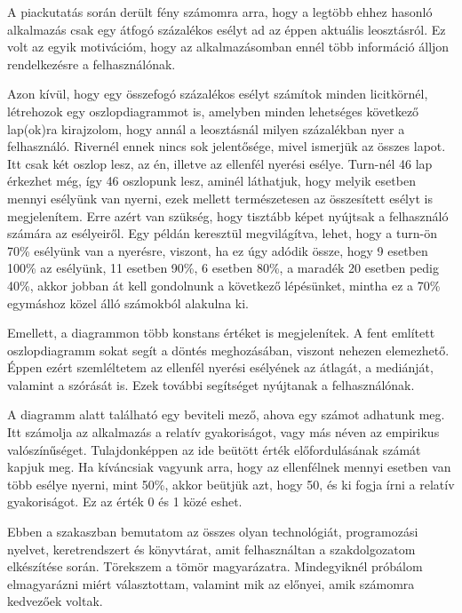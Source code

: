 
A piackutatás során derült fény számomra arra, hogy a legtöbb ehhez hasonló alkalmazás csak egy átfogó százalékos esélyt ad az éppen aktuális leosztásról. Ez volt az egyik motivációm, hogy az alkalmazásomban ennél több információ álljon rendelkezésre a felhasználónak.

Azon kívül, hogy egy összefogó százalékos esélyt számítok minden licitkörnél, létrehozok egy oszlopdiagrammot is, amelyben minden lehetséges következő lap(ok)ra kirajzolom, hogy annál a leosztásnál milyen százalékban nyer a felhasználó. Rivernél ennek nincs sok jelentősége, mivel ismerjük az összes lapot. Itt csak két oszlop lesz, az én, illetve az ellenfél nyerési esélye. Turn-nél 46 lap érkezhet még, így 46 oszlopunk lesz, aminél láthatjuk, hogy melyik esetben mennyi esélyünk van nyerni, ezek mellett természetesen az összesített esélyt is megjelenítem. Erre azért van szükség, hogy tisztább képet nyújtsak a felhasználó számára az esélyeiről. Egy példán keresztül megvilágítva, lehet, hogy a turn-ön 70\% esélyünk van a nyerésre, viszont, ha ez úgy adódik össze, hogy 9 esetben 100\% az esélyünk, 11 esetben 90\%, 6 esetben 80\%, a maradék 20 esetben pedig 40\%, akkor jobban át kell gondolnunk a következő lépésünket, mintha ez a 70\% egymáshoz közel álló számokból alakulna ki.

Emellett, a diagrammon több konstans értéket is megjelenítek. A fent említett oszlopdiagramm sokat segít a döntés meghozásában, viszont nehezen elemezhető. Éppen ezért szemléltetem az ellenfél nyerési esélyének az átlagát, a mediánját, valamint a szórását is. Ezek további segítséget nyújtanak a felhasználónak.

A diagramm alatt található egy beviteli mező, ahova egy számot adhatunk meg. Itt számolja az alkalmazás a relatív gyakoriságot, vagy más néven az empirikus valószínűséget. Tulajdonképpen az ide beütött érték előfordulásának számát kapjuk meg. Ha kíváncsiak vagyunk arra, hogy az ellenfélnek mennyi esetben van több esélye nyerni, mint 50\%, akkor beütjük azt, hogy 50, és ki fogja írni a relatív gyakoriságot. Ez az érték 0 és 1 közé eshet.


Ebben a szakaszban bemutatom az összes olyan technológiát, programozási nyelvet, keretrendszert és könyvtárat, amit felhasználtan a szakdolgozatom elkészítése során. Törekszem a tömör magyarázatra. Mindegyiknél próbálom elmagyarázni miért választottam, valamint mik az előnyei, amik számomra kedvezőek voltak.

